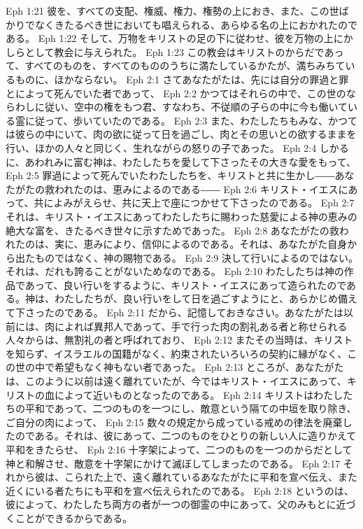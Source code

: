 Eph 1:21  彼を、すべての支配、権威、権力、権勢の上におき、また、この世ばかりでなくきたるべき世においても唱えられる、あらゆる名の上におかれたのである。
Eph 1:22  そして、万物をキリストの足の下に従わせ、彼を万物の上にかしらとして教会に与えられた。
Eph 1:23  この教会はキリストのからだであって、すべてのものを、すべてのもののうちに満たしているかたが、満ちみちているものに、ほかならない。
Eph 2:1  さてあなたがたは、先には自分の罪過と罪とによって死んでいた者であって、
Eph 2:2  かつてはそれらの中で、この世のならわしに従い、空中の権をもつ君、すなわち、不従順の子らの中に今も働いている霊に従って、歩いていたのである。
Eph 2:3  また、わたしたちもみな、かつては彼らの中にいて、肉の欲に従って日を過ごし、肉とその思いとの欲するままを行い、ほかの人々と同じく、生れながらの怒りの子であった。
Eph 2:4  しかるに、あわれみに富む神は、わたしたちを愛して下さったその大きな愛をもって、
Eph 2:5  罪過によって死んでいたわたしたちを、キリストと共に生かし――あなたがたの救われたのは、恵みによるのである――
Eph 2:6  キリスト・イエスにあって、共によみがえらせ、共に天上で座につかせて下さったのである。
Eph 2:7  それは、キリスト・イエスにあってわたしたちに賜わった慈愛による神の恵みの絶大な富を、きたるべき世々に示すためであった。
Eph 2:8  あなたがたの救われたのは、実に、恵みにより、信仰によるのである。それは、あなたがた自身から出たものではなく、神の賜物である。
Eph 2:9  決して行いによるのではない。それは、だれも誇ることがないためなのである。
Eph 2:10  わたしたちは神の作品であって、良い行いをするように、キリスト・イエスにあって造られたのである。神は、わたしたちが、良い行いをして日を過ごすようにと、あらかじめ備えて下さったのである。
Eph 2:11  だから、記憶しておきなさい。あなたがたは以前には、肉によれば異邦人であって、手で行った肉の割礼ある者と称せられる人々からは、無割礼の者と呼ばれており、
Eph 2:12  またその当時は、キリストを知らず、イスラエルの国籍がなく、約束されたいろいろの契約に縁がなく、この世の中で希望もなく神もない者であった。
Eph 2:13  ところが、あなたがたは、このように以前は遠く離れていたが、今ではキリスト・イエスにあって、キリストの血によって近いものとなったのである。
Eph 2:14  キリストはわたしたちの平和であって、二つのものを一つにし、敵意という隔ての中垣を取り除き、ご自分の肉によって、
Eph 2:15  数々の規定から成っている戒めの律法を廃棄したのである。それは、彼にあって、二つのものをひとりの新しい人に造りかえて平和をきたらせ、
Eph 2:16  十字架によって、二つのものを一つのからだとして神と和解させ、敵意を十字架にかけて滅ぼしてしまったのである。
Eph 2:17  それから彼は、こられた上で、遠く離れているあなたがたに平和を宣べ伝え、また近くにいる者たちにも平和を宣べ伝えられたのである。
Eph 2:18  というのは、彼によって、わたしたち両方の者が一つの御霊の中にあって、父のみもとに近づくことができるからである。
